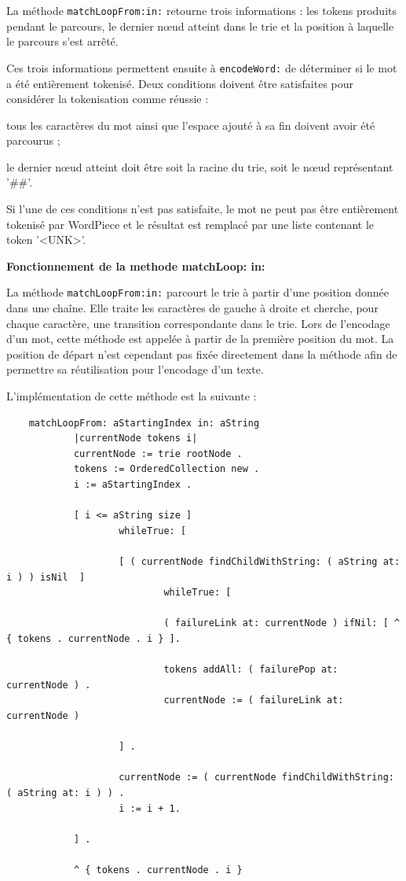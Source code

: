 \documentclass[12pt,a4paper]{report}
\begin{document}
	La méthode \texttt{matchLoopFrom:in:} retourne trois informations : les tokens produits pendant le parcours, le dernier nœud atteint dans le trie et la position à laquelle le parcours s'est arrêté.
	
	Ces trois informations permettent ensuite à \texttt{encodeWord:} de déterminer si le mot a été entièrement tokenisé. Deux conditions doivent être satisfaites pour considérer la tokenisation comme réussie :
	
	\begin{itemizeFB}
		\item tous les caractères du mot ainsi que l'espace ajouté à sa fin doivent avoir été parcourus ;
		
		\item le dernier nœud atteint doit être soit la racine du trie, soit le nœud représentant '\#\#'.
	\end{itemizeFB}
	
	Si l'une de ces conditions n'est pas satisfaite, le mot ne peut pas être entièrement tokenisé par WordPiece et le résultat est remplacé par une liste contenant le token '<UNK>'.
	
	\textbf{Fonctionnement de la methode matchLoop: in:}
	
	La méthode \texttt{matchLoopFrom:in:} parcourt le trie à partir d'une position donnée dans une chaîne. Elle traite les caractères de gauche à droite et cherche, pour chaque caractère, une transition correspondante dans le trie.
	Lors de l'encodage d'un mot, cette méthode est appelée à partir de la première position du mot. La position de départ n'est cependant pas fixée directement dans la méthode afin de permettre sa réutilisation pour l'encodage d'un texte.
	
	L'implémentation de cette méthode est la suivante :
	
	\begin{verbatim}
	matchLoopFrom: aStartingIndex in: aString
			|currentNode tokens i|
			currentNode := trie rootNode .
			tokens := OrderedCollection new .
			i := aStartingIndex .
			
			[ i <= aString size ]
					whileTrue: [
					
					[ ( currentNode findChildWithString: ( aString at: i ) ) isNil  ]
							whileTrue: [
					
							( failureLink at: currentNode ) ifNil: [ ^ { tokens . currentNode . i } ].
			
							tokens addAll: ( failurePop at: currentNode ) .
							currentNode := ( failureLink at: currentNode )
					
					] .
					
					currentNode := ( currentNode findChildWithString: ( aString at: i ) ) .
					i := i + 1.
					
			] .
					
			^ { tokens . currentNode . i }	
	\end{verbatim}
	
\end{document}
